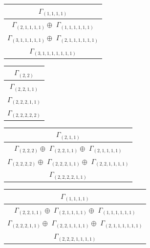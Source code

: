 \documentclass[main.tex]{subfiles}
\begin{document}
\begin{minipage}{.3\textwidth}
\centering
\begin{tabular}{c}
$\Gamma_{(
1 , 
1 , 
1 , 
1
)}$
\\ \hline
$\Gamma_{(
2 , 
1 , 
1 , 
1 , 
1
)} \oplus$
$\Gamma_{(
1 , 
1 , 
1 , 
1 , 
1 , 
1
)}$
\\ \hline
$\Gamma_{(
3 , 
1 , 
1 , 
1 , 
1 , 
1
)} \oplus$
$\Gamma_{(
2 , 
1 , 
1 , 
1 , 
1 , 
1 , 
1
)}$
\\ \hline
$\Gamma_{(
3 , 
1 , 
1 , 
1 , 
1 , 
1 , 
1 , 
1
)}$
\\
\end{tabular}\end{minipage}
\begin{minipage}{.2\textwidth}
\centering
\begin{tabular}{c}
$\Gamma_{(
2 , 
2
)}$
\\ \hline
$\Gamma_{(
2 , 
2 , 
1 , 
1
)}$
\\ \hline
$\Gamma_{(
2 , 
2 , 
2 , 
1 , 
1
)}$
\\ \hline
$\Gamma_{(
2 , 
2 , 
2 , 
2 , 
2
)}$
\\
\end{tabular}\end{minipage}
\bigskip
\begin{minipage}{.5\textwidth}
\centering
\begin{tabular}{c}
$\Gamma_{(
2 , 
1 , 
1
)}$
\\ \hline
$\Gamma_{(
2 , 
2 , 
2
)} \oplus$
$\Gamma_{(
2 , 
2 , 
1 , 
1
)} \oplus$
$\Gamma_{(
2 , 
1 , 
1 , 
1 , 
1
)}$
\\ \hline
$\Gamma_{(
2 , 
2 , 
2 , 
2
)} \oplus$
$\Gamma_{(
2 , 
2 , 
2 , 
1 , 
1
)} \oplus$
$\Gamma_{(
2 , 
2 , 
1 , 
1 , 
1 , 
1
)}$
\\ \hline
$\Gamma_{(
2 , 
2 , 
2 , 
2 , 
1 , 
1
)}$
\\
\end{tabular}\end{minipage}
\begin{minipage}{.5\textwidth}
\centering
\begin{tabular}{c}
$\Gamma_{(
1 , 
1 , 
1 , 
1
)}$
\\ \hline
$\Gamma_{(
2 , 
2 , 
1 , 
1
)} \oplus$
$\Gamma_{(
2 , 
1 , 
1 , 
1 , 
1
)} \oplus$
$\Gamma_{(
1 , 
1 , 
1 , 
1 , 
1 , 
1
)}$
\\ \hline
$\Gamma_{(
2 , 
2 , 
2 , 
1 , 
1
)} \oplus$
$\Gamma_{(
2 , 
2 , 
1 , 
1 , 
1 , 
1
)} \oplus$
$\Gamma_{(
2 , 
1 , 
1 , 
1 , 
1 , 
1 , 
1
)}$
\\ \hline
$\Gamma_{(
2 , 
2 , 
2 , 
1 , 
1 , 
1 , 
1
)}$
\\
\end{tabular}\end{minipage}
\end{document}
